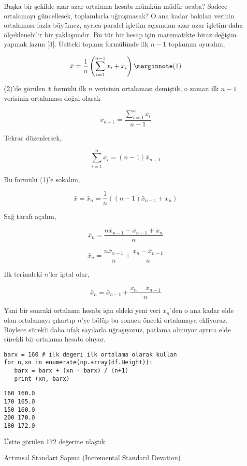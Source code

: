 \documentclass[12pt,fleqn]{article}\usepackage{../../common}
\begin{document}
Başka bir şekilde azar azar ortalama hesabı mümkün müdür acaba? Sadece
ortalamayı güncellesek, toplamlarla uğraşmasak? O ana kadar bakılan verinin
ortalaması fazla büyümez, ayrıca paralel işletim açısından azar azar işletim
daha ölçeklenebilir bir yaklaşımdır. Bu tür bir hesap için matematikte biraz
değişim yapmak lazım [3]. Üstteki toplam formülünde ilk $n-1$ toplamını
ayıralım,

$$
\bar{x} = \frac{1}{n} \left( \sum_{i=1}^{n-1} x_i + x_i \right)
\mlabel{1}
$$

(2)'de görülen $\bar{x}$ formülü ilk $n$ verisinin ortalaması demiştik, o zaman
ilk $n-1$ verisinin ortalaması doğal olarak

$$
\bar{x}_{n-1}  = \frac{\sum_{i=1}^{n} x_i}{n-1} 
$$

Tekrar düzenlersek,

$$
\sum_{i=1}^{n} x_i  = (n-1) \bar{x}_{n-1}  
$$

Bu formülü (1)'e sokalım,

$$
\bar{x} = \bar{x}_n = \frac{1}{n} \left( (n-1) \bar{x}_{n-1} + x_n \right)
$$

Sağ tarafı açalım,

$$
\bar{x}_n = \frac{n \bar{x}_{n-1} - \bar{x}_{n-1} + x_n}{n}
$$

$$
\bar{x}_n = \frac{n \bar{x}_{n-1}}{n} + \frac{x_n - \bar{x}_{n-1}}{n}
$$

İlk terimdeki $n$'ler iptal olur,

$$
\bar{x}_n = \bar{x}_{n-1} + \frac{x_n - \bar{x}_{n-1}}{n}
$$

Yani bir sonraki ortalama hesabı için eldeki yeni veri $x_n$'den o ana kadar
elde olan ortalamayı çıkartıp $n$'ye bölüp bu sonucu önceki ortalamaya
ekliyoruz. Böylece sürekli daha ufak sayılarla uğraşıyoruz, patlama olmuyor
ayrıca elde sürekli bir ortalama hesabı oluyor.

\begin{verbatim}
barx = 160 # ilk degeri ilk ortalama olarak kullan
for n,xn in enumerate(np.array(df.Height)):
   barx = barx + (xn - barx) / (n+1)
   print (xn, barx)   
\end{verbatim}

\begin{verbatim}
160 160.0
170 165.0
150 160.0
200 170.0
180 172.0
\end{verbatim}

Üstte görülen 172 değerine ulaştık.

Artımsal Standart Sapma (Incremental Standard Devation)
\end{document}
